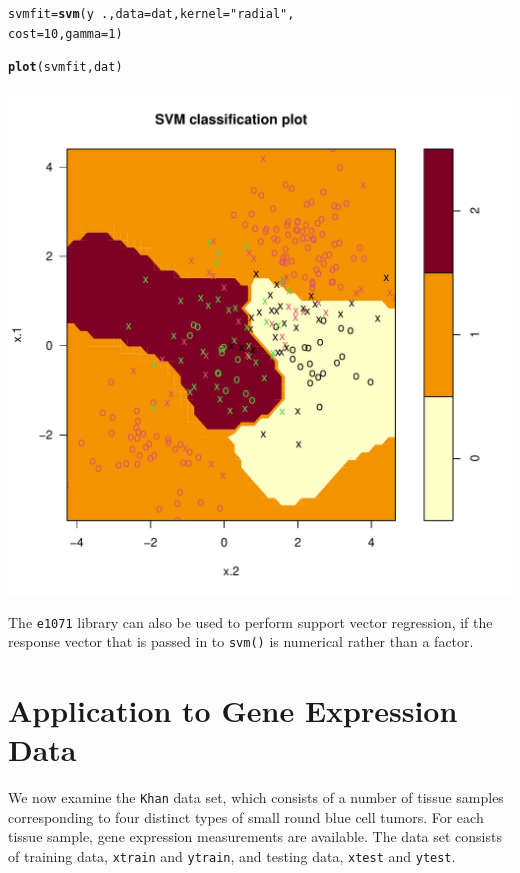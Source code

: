 \documentclass[12pt]{article}\usepackage[]{graphicx}\usepackage[]{color}
\makeatletter
\def\maxwidth{ %
  \ifdim\Gin@nat@width>\linewidth
    \linewidth
  \else
    \Gin@nat@width
  \fi
}
\newcommand{\hlnum}[1]{\textcolor[rgb]{0.686,0.059,0.569}{#1}}%
\newcommand{\hlstr}[1]{\textcolor[rgb]{0.192,0.494,0.8}{#1}}%
\newcommand{\hlopt}[1]{\textcolor[rgb]{0,0,0}{#1}}%
\newcommand{\hlstd}[1]{\textcolor[rgb]{0.345,0.345,0.345}{#1}}%
\newcommand{\hlkwb}[1]{\textcolor[rgb]{0.69,0.353,0.396}{#1}}%
\newcommand{\hlkwc}[1]{\textcolor[rgb]{0.333,0.667,0.333}{#1}}%
\newcommand{\hlkwd}[1]{\textcolor[rgb]{0.737,0.353,0.396}{\textbf{#1}}}%
\newenvironment{kframe}{%
 \def\at@end@of@kframe{}%
 \ifinner\ifhmode%
  \def\at@end@of@kframe{\end{minipage}}%
  \begin{minipage}{\columnwidth}%
 \fi\fi%
 \def\FrameCommand##1{\hskip\@totalleftmargin \hskip-\fboxsep
 \colorbox{shadecolor}{##1}\hskip-\fboxsep
     \hskip-\linewidth \hskip-\@totalleftmargin \hskip\columnwidth}%
 \MakeFramed {\advance\hsize-\width
   \@totalleftmargin\z@ \linewidth\hsize
   \@setminipage}}%
 {\par\unskip\endMakeFramed%
 \at@end@of@kframe}
\newenvironment{knitrout}{}{} %
\makeatother
\begin{document}
\begin{knitrout}
\color{fgcolor}\begin{kframe}
\begin{alltt}
\hlstd{svmfit}\hlkwb{=}\hlkwd{svm}\hlstd{(y}\hlopt{~}\hlstd{.,} \hlkwc{data}\hlstd{=dat,} \hlkwc{kernel}\hlstd{=}\hlstr{"radial"}\hlstd{,}
           \hlkwc{cost}\hlstd{=}\hlnum{10}\hlstd{,} \hlkwc{gamma}\hlstd{=}\hlnum{1}\hlstd{)}

\hlkwd{plot}\hlstd{(svmfit,dat)}
\end{alltt}
\end{kframe}
\includegraphics[width=\maxwidth]{figure/unnamed-chunk-28-1} 

\end{knitrout}

The \texttt{e1071} library can also be used to perform support vector regression, if the response vector that is passed in to \texttt{svm()} is numerical rather than a factor.

\newpage
\section{Application to Gene Expression Data}

We now examine the \texttt{Khan} data set, which consists of a number of tissue samples corresponding to four distinct types of small round blue cell tumors. For each tissue sample, gene expression measurements are available. The data set consists of training data, \texttt{xtrain} and \texttt{ytrain}, and testing data, \texttt{xtest} and \texttt{ytest}.
\end{document}
